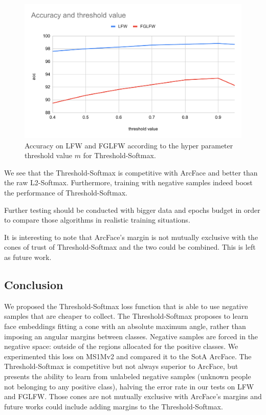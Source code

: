 \begin{figure}
    \centering
    \includegraphics[width=\columnwidth]{50-files/tsm-angle.pdf}
    \caption{Accuracy on LFW and FGLFW according to the hyper parameter threshold value $m$ for Threshold-Softmax.}
    \label{fig:tsm-angle}
\end{figure}

We see that the Threshold-Softmax is competitive with ArcFace and better than the raw L2-Softmax. Furthermore, training with negative samples indeed boost the performance of Threshold-Softmax.

Further testing should be conducted with bigger data and epochs budget in order to compare those algorithms in realistic training situations.

It is interesting to note that ArcFace's margin is not mutually exclusive with the cones of trust of Threshold-Softmax and the two could be combined. This is left as future work.

\subsection{Conclusion}

We proposed the Threshold-Softmax loss function that is able to use negative samples that are cheaper to collect. The Threshold-Softmax proposes to learn face embeddings fitting a cone with an absolute maximum angle, rather than imposing an angular margins between classes. Negative samples are forced in the negative space: outside of the regions allocated for the positive classes. We experimented this loss on MS1Mv2 and compared it to the \ac{SotA} ArcFace. The Threshold-Softmax is competitive but not always superior to ArcFace, but presents the ability to learn from unlabeled negative samples (unknown people not belonging to any positive class), halving the error rate in our tests on LFW and FGLFW. Those cones are not mutually exclusive with ArcFace's margins and future works could include adding margins to the Threshold-Softmax.

